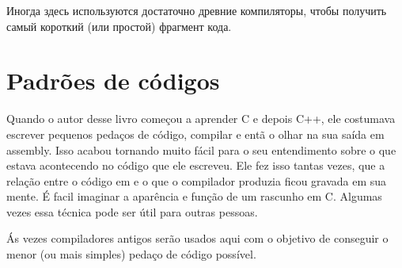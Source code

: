 
Иногда здесь используются достаточно древние компиляторы, чтобы получить самый короткий (или простой) фрагмент кода.
\fi %

\ifdefined\BRAZILIAN
\part{Padrões de códigos}

Quando o autor desse livro começou a aprender C e depois C++, ele costumava escrever pequenos pedaços de código, compilar e entã o olhar na sua saída em assembly.
Isso acabou tornando muito fácil para o seu entendimento sobre o que estava acontecendo no código que ele escreveu.
Ele fez isso tantas vezes, que a relação entre o código em \CCpp e o que o compilador produzia ficou gravada em sua mente.
É facil imaginar a aparência e função de um rascunho em C. Algumas vezes essa técnica pode ser útil para outras pessoas.

Ás vezes compiladores antigos serão usados aqui com o objetivo de conseguir o menor (ou mais simples) pedaço de código possível.

\iffalse
\part{Padrões de código}

\epigraph{Tudo é relativo}{Autor desconhecido}

Quando o autor deste livro começou a aprender C e, mais tarde, \Cpp, ele costumava escrever pequenos pedaços de código, compilá-los, 
e então olhar a saída em linguagem assembly. Isso tornou muito fácil para ele entender o que estava acontecendo no código que ele tinha escrito.
\footnote{Na verdade, ele ainda faz isso quando não consegue entender o que faz um determinado pedaço de código.}. 
Ele fez isso tantas vezes que o relacionamento entre o código \CCpp code e o que o compilador produzia ficou registrado profundamente em sua mente. 
É fácil imaginar de imediato um esboço da aparência e função do código C. 
Talvez essa técnica poderia ser útil para mais alguém.


Em determinadas partes foram usados aqui compiladores muito antigos, para se obter o menor (ou mais simples) snippet possível.
\fi
\fi %

